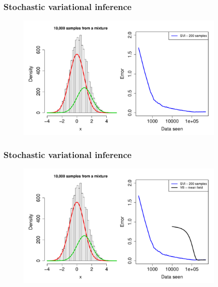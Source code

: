 \documentclass{beamer}
\begin{document}
\begin{frame}
  \frametitle{Stochastic variational inference}

  \begin{figure}
  \begin{center}
  \includegraphics[width=0.9\textwidth]{mixture1.pdf}
  \end{center}
  \end{figure}

\end{frame}

\begin{frame}
  \frametitle{Stochastic variational inference}

  \begin{figure}
  \begin{center}
  \includegraphics[width=0.9\textwidth]{mixture2.pdf}
  \end{center}
  \end{figure}

\end{frame}
\end{document}
